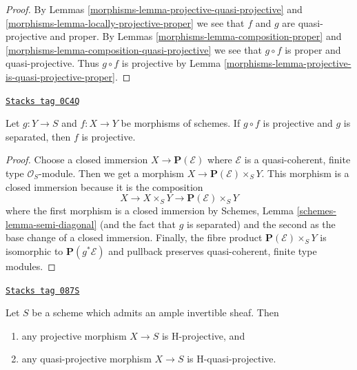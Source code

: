 \begin{proof}

By Lemmas \ref{morphisms-lemma-projective-quasi-projective} and
\ref{morphisms-lemma-locally-projective-proper}
we see that $f$ and $g$ are quasi-projective and proper.
By Lemmas \ref{morphisms-lemma-composition-proper} and
\ref{morphisms-lemma-composition-quasi-projective}
we see that $g \circ f$ is proper and quasi-projective.
Thus $g \circ f$ is projective by
Lemma \ref{morphisms-lemma-projective-is-quasi-projective-proper}.
\end{proof}

\begin{lemma}
\label{morphisms-lemma-projective-permanence}
\href{https://stacks.math.columbia.edu/tag/0C4Q}{\texttt{Stacks tag 0C4Q}}

Let $g : Y \to S$ and $f : X \to Y$ be morphisms of schemes.
If $g \circ f$ is projective and $g$ is separated,
then $f$ is projective.
\end{lemma}

\begin{proof}
Choose a closed immersion $X \to \mathbf{P}(\mathcal{E})$ where $\mathcal{E}$
is a quasi-coherent, finite type $\mathcal{O}_S$-module. Then
we get a morphism $X \to \mathbf{P}(\mathcal{E}) \times_S Y$.
This morphism is a closed immersion because it is the composition
$$
X \to X \times_S Y \to \mathbf{P}(\mathcal{E}) \times_S Y
$$
where the first morphism is a closed immersion by
Schemes, Lemma \ref{schemes-lemma-semi-diagonal}
(and the fact that $g$ is separated) and
the second as the base change of a closed immersion.
Finally, the fibre product $\mathbf{P}(\mathcal{E}) \times_S Y$
is isomorphic to $\mathbf{P}(g^*\mathcal{E})$ and pullback
preserves quasi-coherent, finite type modules.
\end{proof}

\begin{lemma}
\label{morphisms-lemma-projective-over-quasi-projective-is-H-projective}
\href{https://stacks.math.columbia.edu/tag/087S}{\texttt{Stacks tag 087S}}

Let $S$ be a scheme which admits an ample invertible sheaf. Then
\begin{enumerate}
\item any projective morphism $X \to S$ is H-projective, and
\item any quasi-projective morphism $X \to S$ is H-quasi-projective.
\end{enumerate}
\end{lemma}

